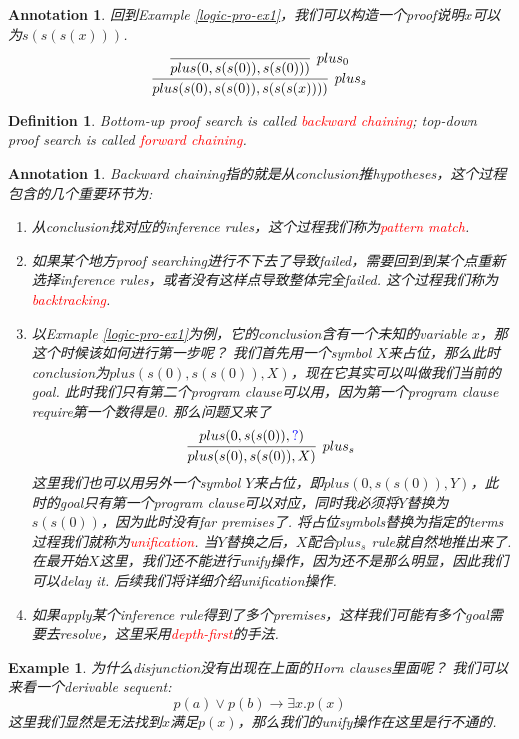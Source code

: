 \documentclass{article}
\theoremstyle{plain}
\newtheorem{example}[theorem]{Example}
\newtheorem{definition}[theorem]{Definition}
\newtheorem{annotation}[theorem]{Annotation}
\theoremstyle{nonumberplain}
\newcommand{\redt}[1]{\textcolor{red}{#1}}
\newcommand{\bluet}[1]{\textcolor{blue}{#1}}
\begin{document}
\begin{annotation}
\rm 回到Example \ref{logic-pro-ex1}，我们可以构造一个proof说明$x$可以为$s(s(s(x)))$.
$$
\infer[plus_s]{plus(s(0),s(s(0)),s(s(s(x))))}{\infer[plus_0]{plus(0,s(s(0)),s(s(0)))}{}}
$$
\end{annotation}

\begin{definition}
\rm Bottom-up proof search is called \redt{backward chaining}; top-down proof search is called \redt{forward chaining}.
\end{definition}

\begin{annotation}
\rm Backward chaining指的就是从conclusion推hypotheses，这个过程包含的几个重要环节为: 
\begin{enumerate}
	\item 从conclusion找对应的inference rules，这个过程我们称为\redt{pattern match}.
	\item 如果某个地方proof searching进行不下去了导致failed，需要回到到某个点重新选择inference rules，或者没有这样点导致整体完全failed. 这个过程我们称为\redt{backtracking}.
	\item 以Exmaple \ref{logic-pro-ex1}为例，它的conclusion含有一个未知的variable $x$，那这个时候该如何进行第一步呢？ 我们首先用一个symbol $X$来占位，那么此时conclusion为$plus(s(0),s(s(0)), X)$，现在它其实可以叫做我们当前的goal. 此时我们只有第二个program clause可以用，因为第一个program clause require第一个数得是0. 那么问题又来了
	$$
	\infer[plus_s]{plus(s(0),s(s(0)), X)}{plus(0,s(s(0)), \bluet{?})}
	$$
	这里我们也可以用另外一个symbol $Y$来占位，即$plus(0,s(s(0)), Y)$，此时的goal只有第一个program clause可以对应，同时我必须将$Y$替换为$s(s(0))$，因为此时没有far premises了. 将占位symbols替换为指定的terms过程我们就称为\redt{unification}. 当$Y$替换之后，$X$配合$plus_s$ rule就自然地推出来了. 在最开始$X$这里，我们还不能进行unify操作，因为还不是那么明显，因此我们可以delay it. 后续我们将详细介绍unification操作. 
	\item 如果apply某个inference rule得到了多个premises，这样我们可能有多个goal需要去resolve，这里采用\redt{depth-first}的手法.    
\end{enumerate}
\end{annotation}

\begin{example}
\rm 为什么disjunction没有出现在上面的Horn clauses里面呢？ 我们可以来看一个derivable sequent:
$$
p(a) \vee p(b) \to \exists x.p(x)
$$
这里我们显然是无法找到$x$满足$p(x)$，那么我们的unify操作在这里是行不通的. 
\end{example}
\end{document}
